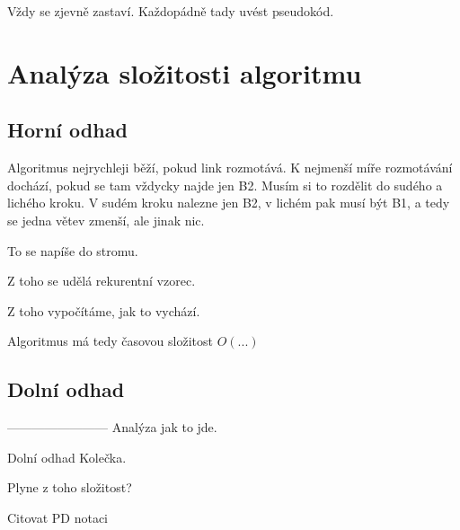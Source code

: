 Vždy se zjevně zastaví.
Každopádně tady uvést pseudokód.
\section{Analýza složitosti algoritmu}
\subsection{Horní odhad}
Algoritmus nejrychleji běží, pokud link rozmotává. K nejmenší míře rozmotávání dochází, pokud se tam vždycky najde jen B2. Musím si to rozdělit do sudého a lichého kroku. V sudém kroku nalezne jen B2, v lichém pak musí být B1, a tedy se jedna větev zmenší, ale jinak nic.

To se napíše do stromu.

Z toho se udělá rekurentní vzorec.

Z toho vypočítáme, jak to vychází.

Algoritmus má tedy časovou složitost $O(...)$

\subsection{Dolní odhad}
------------------------
Analýza jak to jde.

Dolní odhad
Kolečka.

Plyne z toho složitost?

Citovat PD notaci